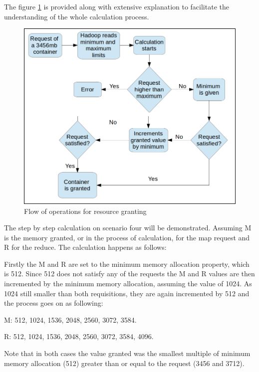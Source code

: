 The figure \ref{fig:fluxoAllocation2} is provided along with extensive explanation to facilitate the understanding of the whole calculation process. 

\begin{figure}[!hbtn]
   \renewcommand{\figurename}{Figure}
   \centering
   \includegraphics[width=15cm]{figuras/Figura19-allocflow2.png}
   \caption{Flow of operations for resource granting}
   \label{fig:fluxoAllocation2}
\end{figure}

The step by step calculation on scenario four will be demonstrated. Assuming M is the memory granted, or in the process of calculation, for the map request and R for the reduce. The calculation happens as follows:

Firstly the M and R are set to the minimum memory allocation property, which is 512. Since 512 does not satisfy any of the requests the M and R values are then incremented by the minimum memory allocation, assuming the value of 1024. As 1024 still smaller than both requisitions, they are again incremented by 512 and the process goes on as following:

M: 512, 1024, 1536, 2048, 2560, 3072, 3584.

R: 512, 1024, 1536, 2048, 2560, 3072, 3584, 4096.

Note that in both cases the value granted was the smallest multiple of minimum memory allocation (512) greater than or equal to the request (3456 and 3712).


